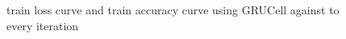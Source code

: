 \documentclass{elegantbook}
\begin{document}
\begin{figure}[!h]
\begin{minipage}[t]{0.48\textwidth}
	\end{minipage}
	\caption{\label{trainres12}train loss curve and train accuracy curve using GRUCell against to every iteration}
\end{figure}

\end{document}

